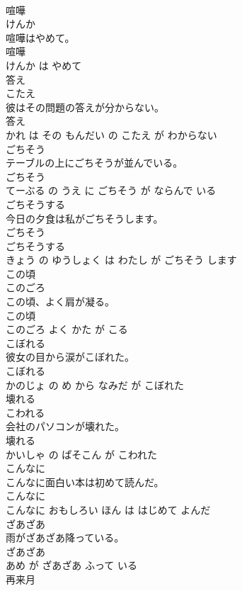 \documentclass[8pt]{extreport}
\begin{document}
\begin{CJK}{UTF8}{min}
\\	喧嘩	
\\	けんか			
\\	喧嘩はやめて。	
\\	喧嘩 
\\	けんか は やめて			
\\	答え	
\\	こたえ			
\\	彼はその問題の答えが分からない。	
\\	答え 
\\	かれ は その もんだい の こたえ が わからない			
\\	ごちそう	
\\	テーブルの上にごちそうが並んでいる。	
\\	ごちそう 
\\	てーぶる の うえ に ごちそう が ならんで いる			
\\	ごちそうする	
\\	今日の夕食は私がごちそうします。	
\\	ごちそう 
\\	ごちそうする 
\\	きょう の ゆうしょく は わたし が ごちそう します			
\\	この頃	
\\	このごろ			
\\	この頃、よく肩が凝る。	
\\	この頃 
\\	このごろ よく かた が こる			
\\	こぼれる	
\\	彼女の目から涙がこぼれた。	
\\	こぼれる 
\\	かのじょ の め から なみだ が こぼれた			
\\	壊れる	
\\	こわれる			
\\	会社のパソコンが壊れた。	
\\	壊れる 
\\	かいしゃ の ぱそこん が こわれた			
\\	こんなに	
\\	こんなに面白い本は初めて読んだ。	
\\	こんなに 
\\	こんなに おもしろい ほん は はじめて よんだ			
\\	ざあざあ	
\\	雨がざあざあ降っている。	
\\	ざあざあ 
\\	あめ が ざあざあ ふって いる			
\\	再来月	

\end{CJK}
\end{document}
